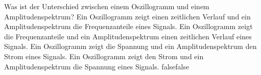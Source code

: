     {Was ist der Unterschied zwischen einem Oszillogramm und einem Amplitudenspektrum?}
    {Ein Oszillogramm zeigt einen zeitlichen Verlauf und ein Amplitudenspektrum die Frequenzanteile eines Signals.}
    {Ein Oszillogramm zeigt die Frequenzanteile und ein Amplitudenspektrum einen zeitlichen Verlauf eines Signals.}
    {Ein Oszillogramm zeigt die Spannung und ein Amplitudenspektrum den Strom eines Signals.}
    {Ein Oszillogramm zeigt den Strom und ein Amplitudenspektrum die Spannung eines Signals.}
    {false}{false}
